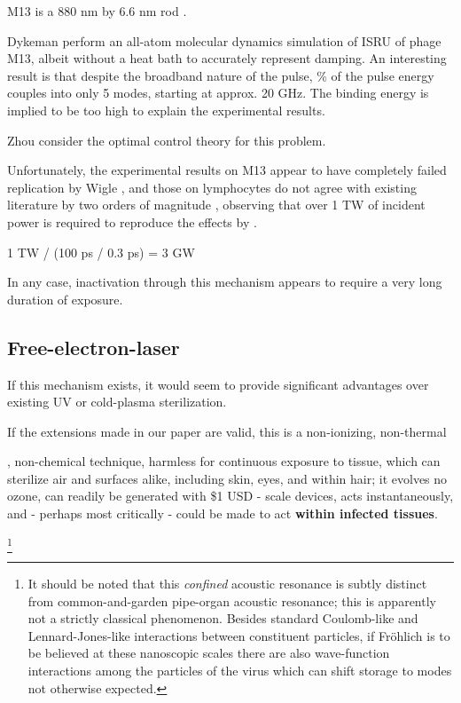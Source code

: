 \documentclass[paper.tex]{subfiles}
\begin{document}
\begin{multicols}{1}
M13 is a 880 nm by 6.6 nm rod \cite{M132015}. 

Dykeman \cite{Vibrational2009} perform an all-atom molecular dynamics simulation of ISRU of phage M13, albeit without a heat bath to accurately represent damping. An interesting result is that despite the broadband nature of the pulse, \% of the pulse energy couples into only 5 modes, starting at approx. 20 GHz. The binding energy is implied to be too high to explain the experimental results. 

Zhou \cite{Maximum2010} consider the optimal control theory for this problem. 

Unfortunately, the experimental results on M13 appear to have completely failed replication by Wigle \cite{No2011}, and those on lymphocytes do not agree with existing literature by two orders of magnitude \cite{Targeted2002}, observing that over 1 TW of incident power is required to reproduce the effects by . 

1 TW / (100 ps / 0.3 ps) = 3 GW 

In any case, inactivation through this mechanism appears to require a very long duration of exposure.




\subsection{Free-electron-laser }


If this mechanism exists, it would seem to provide significant advantages over existing UV or cold-plasma sterilization. 

If the extensions made in our paper are valid, this is a non-ionizing, non-thermal

, non-chemical technique, harmless for continuous exposure to tissue, which can sterilize air and surfaces alike, including skin, eyes, and within hair; it evolves no ozone, can readily be generated with \$1 USD - scale devices, acts instantaneously, and - perhaps most critically - could be made to act {\bf within infected tissues}.




\footnote{It should be noted that this {\it confined} acoustic resonance is subtly distinct from common-and-garden pipe-organ acoustic resonance; this is apparently not a strictly classical phenomenon. Besides standard Coulomb-like and Lennard-Jones-like interactions between constituent particles, if Fr\"{o}hlich is to be believed at these nanoscopic scales there are also wave-function interactions among the particles of the virus which can shift storage to modes not otherwise expected.
	
}
\end{multicols}
\end{document}
